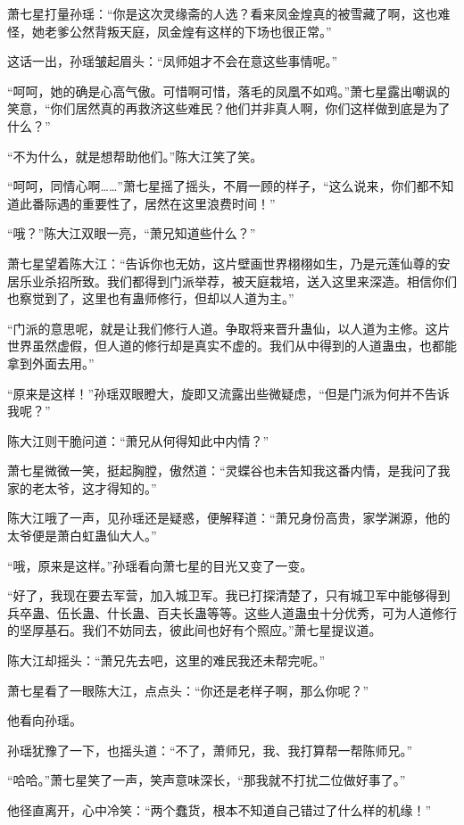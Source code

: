 \begin{this_body}
萧七星打量孙瑶：“你是这次灵缘斋的人选？看来凤金煌真的被雪藏了啊，这也难怪，她老爹公然背叛天庭，凤金煌有这样的下场也很正常。”

这话一出，孙瑶皱起眉头：“凤师姐才不会在意这些事情呢。”

“呵呵，她的确是心高气傲。可惜啊可惜，落毛的凤凰不如鸡。”萧七星露出嘲讽的笑意，“你们居然真的再救济这些难民？他们并非真人啊，你们这样做到底是为了什么？”

“不为什么，就是想帮助他们。”陈大江笑了笑。

“呵呵，同情心啊……”萧七星摇了摇头，不屑一顾的样子，“这么说来，你们都不知道此番际遇的重要性了，居然在这里浪费时间！”

“哦？”陈大江双眼一亮，“萧兄知道些什么？”

萧七星望着陈大江：“告诉你也无妨，这片壁画世界栩栩如生，乃是元莲仙尊的安居乐业杀招所致。我们都得到门派举荐，被天庭栽培，送入这里来深造。相信你们也察觉到了，这里也有蛊师修行，但却以人道为主。”

“门派的意思呢，就是让我们修行人道。争取将来晋升蛊仙，以人道为主修。这片世界虽然虚假，但人道的修行却是真实不虚的。我们从中得到的人道蛊虫，也都能拿到外面去用。”

“原来是这样！”孙瑶双眼瞪大，旋即又流露出些微疑虑，“但是门派为何并不告诉我呢？”

陈大江则干脆问道：“萧兄从何得知此中内情？”

萧七星微微一笑，挺起胸膛，傲然道：“灵蝶谷也未告知我这番内情，是我问了我家的老太爷，这才得知的。”

陈大江哦了一声，见孙瑶还是疑惑，便解释道：“萧兄身份高贵，家学渊源，他的太爷便是萧白虹蛊仙大人。”

“哦，原来是这样。”孙瑶看向萧七星的目光又变了一变。

“好了，我现在要去军营，加入城卫军。我已打探清楚了，只有城卫军中能够得到兵卒蛊、伍长蛊、什长蛊、百夫长蛊等等。这些人道蛊虫十分优秀，可为人道修行的坚厚基石。我们不妨同去，彼此间也好有个照应。”萧七星提议道。

陈大江却摇头：“萧兄先去吧，这里的难民我还未帮完呢。”

萧七星看了一眼陈大江，点点头：“你还是老样子啊，那么你呢？”

他看向孙瑶。

孙瑶犹豫了一下，也摇头道：“不了，萧师兄，我、我打算帮一帮陈师兄。”

“哈哈。”萧七星笑了一声，笑声意味深长，“那我就不打扰二位做好事了。”

他径直离开，心中冷笑：“两个蠢货，根本不知道自己错过了什么样的机缘！”


\end{this_body}
